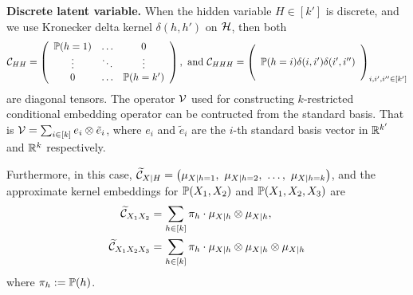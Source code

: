 \documentclass{article}
\begin{document}
{\bf Discrete latent variable.} When the hidden variable $H \in [k']$ is discrete, and we use Kronecker delta kernel $\delta(h,h')$ on $\mathcal{H}$, then both
\begin{align}
 \mathcal{C}_{HH} = \left(
  \begin{array}{ccc}
    \mathbb{P}(h=1) & \ldots & 0 \cr
    \vdots & \ddots & \vdots \cr
    0 & \ldots & \mathbb{P}(h=k')
  \end{array}
 \right),
 ~\text{and}~
 \mathcal{C}_{HHH} = \left(
  \begin{array}{c}
    \cr
    \mathbb{P}(h=i) \delta(i,i') \delta(i',i'') \cr
    \cr
  \end{array}
 \right)_{i,i',i''\in[k']}
\end{align}
are diagonal tensors. The operator $\mathcal{V}$ used for constructing $k$-restricted conditional embedding operator can be contructed from the standard basis. That is $\mathcal{V} = \sum_{i \in [k]} e_i \otimes \tilde e_i$, where $e_i$ and $\tilde e_i$ are the $i$-th standard basis vector in $\mathbb{R}^{k'}$ and $\mathbb{R}^k$ respectively.


Furthermore, in this case, $\widetilde \Ccal_{X|H} = \rbr{\mu_{X|h=1},\ \mu_{X|h=2},\ \ldots,\ \mu_{X|h=k}}$, and the approximate kernel embeddings for $\mathbb{P}(X_1,X_2)$ and $\mathbb{P}(X_1,X_2,X_3)$ are
\begin{align}
  \widetilde {\mathcal{C}}_{X_1 X_2}
  & = \sum_{h \in [k]} \pi_h \cdot \mu_{X|h} \otimes \mu_{X|h}, \label{eq:joint2} \\
  \widetilde {\mathcal{C}}_{X_1 X_2 X_3}
  &= \sum_{h \in [k]} \pi_h \cdot \mu_{X|h} \otimes \mu_{X|h} \otimes \mu_{X|h} \label{eq:joint3}
\end{align}
where $\pi_h:=\mathbb{P}(h)$.
\end{document}
